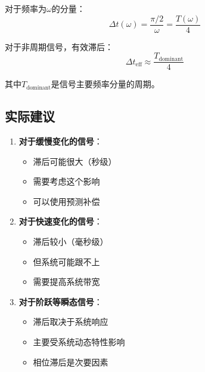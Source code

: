 \documentclass[12pt,a4paper]{article}
\begin{document}
对于频率为$\omega$的分量：
\begin{equation}
\Delta t(\omega) = \frac{\pi/2}{\omega} = \frac{T(\omega)}{4}
\end{equation}

对于非周期信号，有效滞后：
\begin{equation}
\Delta t_{\text{eff}} \approx \frac{T_{\text{dominant}}}{4}
\end{equation}

其中$T_{\text{dominant}}$是信号主要频率分量的周期。

\subsection{实际建议}

\begin{enumerate}
\item \textbf{对于缓慢变化的信号}：
\begin{itemize}
\item 滞后可能很大（秒级）
\item 需要考虑这个影响
\item 可以使用预测补偿
\end{itemize}

\item \textbf{对于快速变化的信号}：
\begin{itemize}
\item 滞后较小（毫秒级）
\item 但系统可能跟不上
\item 需要提高系统带宽
\end{itemize}

\item \textbf{对于阶跃等瞬态信号}：
\begin{itemize}
\item 滞后取决于系统响应
\item 主要受系统动态特性影响
\item 相位滞后是次要因素
\end{itemize}
\end{enumerate}
\end{document}
